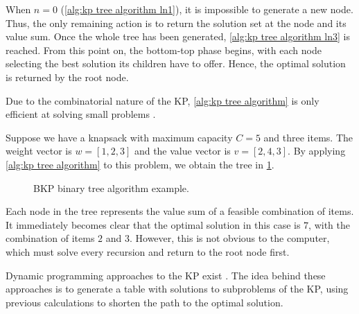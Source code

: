 When $n = 0$ (\cref{alg:kp tree algorithm ln1}), it is impossible to generate a new node. Thus, the only remaining action is to return the solution set at the node and its value sum. Once the whole tree has been generated, \cref{alg:kp tree algorithm ln3} is reached. From this point on, the bottom-top phase begins, with each node selecting the best solution its children have to offer. Hence, the optimal solution is returned by the root node.

Due to the combinatorial nature of the KP, \cref{alg:kp tree algorithm} is only efficient at solving small problems \cite{FEOFILOFF2020a}.

\begin{example}
    Suppose we have a knapsack with maximum capacity $C = 5$ and three items. The weight vector is $w = [1, 2, 3]$ and the value vector is $v = [2, 4, 3]$. By applying \cref{alg:kp tree algorithm} to this problem, we obtain the tree in \cref{fig:kp tree example}.

    \begin{figure}[h]
        \centering
        \caption{BKP binary tree algorithm example.}
        \label{fig:kp tree example}
    \end{figure}
    Each node in the tree represents the value sum of a feasible combination of items. It immediately becomes clear that the optimal solution in this case is $7$, with the combination of items $2$ and $3$. However, this is not obvious to the computer, which must solve every recursion and return to the root node first.
\end{example}

Dynamic programming \cite{WAGNER1995} approaches to the KP exist \cite{FEOFILOFF2020a,HRISTAKEVA2005,DEMAINE2011}. The idea behind these approaches is to generate a table with solutions to subproblems of the KP, using previous calculations to shorten the path to the optimal solution.

